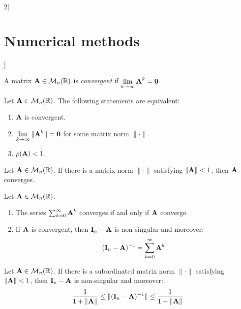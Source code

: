 \documentclass[../../../main.tex]{subfiles}
\begin{document}
\begin{multicols}{2}[\section{Numerical methods}]
\begin{prop}
\begin{enumerate}
        \end{enumerate}
    \end{prop}
    \begin{definition}
        A matrix $\boldsymbol{\mathrm{A}}\in\mathcal{M}_n(\mathbb{R})$ is \textit{convergent} if $\displaystyle\lim_{k\to\infty}\boldsymbol{\mathrm{A}}^k=\boldsymbol{\mathrm{0}}$.
    \end{definition}
    \begin{theorem}
        Let $\boldsymbol{\mathrm{A}}\in\mathcal{M}_n(\mathbb{R})$. The following statements are equivalent:
        \begin{enumerate}
            \item $\boldsymbol{\mathrm{A}}$ is convergent.
            \item $\displaystyle\lim_{k\to\infty}\|\boldsymbol{\mathrm{A}}^k\|=\boldsymbol{\mathrm{0}}$ for some matrix norm $\|\cdot\|$.
            \item $\rho(\boldsymbol{\mathrm{A}})<1$.
        \end{enumerate}
    \end{theorem}
    \begin{corollary}
        Let $\boldsymbol{\mathrm{A}}\in\mathcal{M}_n(\mathbb{R})$. If there is a matrix norm $\|\cdot\|$ satisfying $\|\boldsymbol{\mathrm{A}}\|<1$, then $\boldsymbol{\mathrm{A}}$ converges.
    \end{corollary}
    \begin{theorem}
        Let $\boldsymbol{\mathrm{A}}\in\mathcal{M}_n(\mathbb{R})$.
        \begin{enumerate}
            \item The series $\sum_{k=0}^\infty \boldsymbol{\mathrm{A}}^k$ converges if and only if $\boldsymbol{\mathrm{A}}$ converge.
            \item If $\boldsymbol{\mathrm{A}}$ is convergent, then $\boldsymbol{\mathrm{I}}_n-\boldsymbol{\mathrm{A}}$ is non-singular and moreover: $$(\boldsymbol{\mathrm{I}}_n-\boldsymbol{\mathrm{A}})^{-1}=\sum_{k=0}^\infty\boldsymbol{\mathrm{A}}^k$$
        \end{enumerate}
    \end{theorem}
    \begin{corollary}
        Let $\boldsymbol{\mathrm{A}}\in\mathcal{M}_n(\mathbb{R})$. If there is a subordinated matrix norm $\|\cdot\|$ satisfying $\|\boldsymbol{\mathrm{A}}\|<1$, then $\boldsymbol{\mathrm{I}}_n-\boldsymbol{\mathrm{A}}$ is non-singular and moreover: $$\frac{1}{1+\|\boldsymbol{\mathrm{A}}\|}\leq\|(\boldsymbol{\mathrm{I}}_n-\boldsymbol{\mathrm{A}})^{-1}\|\leq\frac{1}{1-\|\boldsymbol{\mathrm{A}}\|}$$
    \end{corollary}

\end{multicols}
\end{document}
